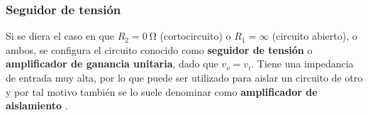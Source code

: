 \subsubsection{Seguidor de tensión}

Si se diera el caso en que $R_2 = \SI{0}{\ohm}$ (cortocircuito) o $R_1 = \infty$ (circuito abierto), o ambos, se configura el circuito conocido como \textbf{seguidor de tensión} o \textbf{amplificador de ganancia unitaria}, dado que $v_o = v_i$. Tiene una impedancia de entrada muy alta, por lo que puede ser utilizado para aislar un circuito de otro \cite[pág. 184]{FDCE} y por tal motivo también se lo suele denominar como \textbf{amplificador de aislamiento} \cite[pág. 109]{huelsman}.
